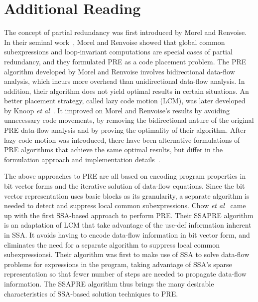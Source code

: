 \section{Additional Reading}
The concept of partial redundancy was first introduced by Morel and Renvoise. 
In their seminal work~\cite{MR79}, Morel and Renvoise showed that global common subexpressions and loop-invariant computations are special cases of partial redundancy, and they formulated PRE as a code placement problem. 
The PRE algorithm developed by Morel and Renvoise involves bidirectional data-flow analysis, which incurs more overhead than unidirectional data-flow analysis. 
In addition, their algorithm does not yield optimal results in certain situations. 
An better placement strategy, called lazy code motion (LCM), was later developed by Knoop {\it et al}~\cite{Knoop92,Knoop94}. 
It improved on Morel and Renvoise's results by avoiding unnecessary code movements, by removing the bidirectional nature of the original PRE data-flow analysis and by proving the optimality of their algorithm. 
After lazy code motion was introduced, there have been alternative formulations of PRE algorithms that achieve the same optimal results, but differ in the formulation approach and implementation details~\cite{DS93,Dhamdhere02,Paleri03,XueKnoop06}.

The above approaches to PRE are all based on encoding program properties in bit vector forms and the iterative solution of data-flow equations. 
Since the bit vector representation uses basic blocks as its granularity, a separate algorithm is needed to detect and suppress local common subexpressions. 
Chow {\it et al}~\cite{Chow97,Kennedy99} came up with the first SSA-based approach to perform PRE. 
Their SSAPRE algorithm is an adaptation of LCM that take advantage of the use-def information inherent in SSA. 
It avoids having to encode data-flow information in bit vector form, and eliminates the need for a separate algorithm to suppress local common subexpressionsi. 
Their algorithm was first to make use of SSA to solve data-flow problems for expressions in the program, taking advantage of SSA's sparse representation so that fewer number of steps are needed to propagate data-flow information. 
The SSAPRE algorithm thus brings the many desirable characteristics of SSA-based solution techniques to PRE.

